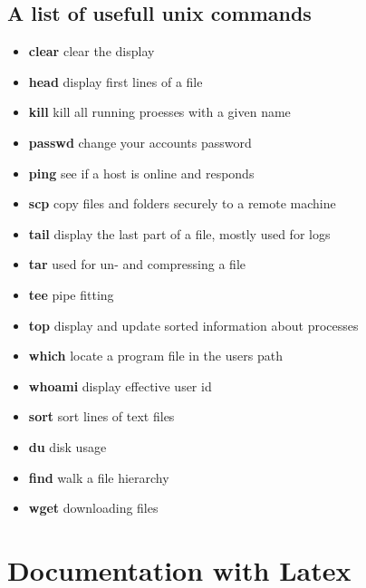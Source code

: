 \documentclass[10pt,a4paper]{scrartcl}
\begin{document}
\begin{description}
\subsection{A list of usefull unix commands}
\begin{doublespacing}
\begin{itemize}
\item{\bf{clear}} \qquad clear the display
\item{\bf{head}} \qquad 	 display first lines of a file
\item{\bf{kill}}	\qquad kill all running proesses with a given name
\item{\bf{passwd}}	\qquad change your accounts password
\item{\bf{ping}}	\qquad see if a host is online and responds
\item{\bf{scp}}		\qquad copy files and folders securely to a remote machine
\item{\bf{tail}}	\qquad display the last part of a file, mostly used for logs
\item{\bf{tar}}		\qquad used for un- and compressing a file
\item{\bf{tee}}		\qquad pipe fitting
\item{\bf{top}}		\qquad display and update sorted information about processes
\item{\bf{which}}	\qquad locate a program file in the users path
\item{\bf{whoami}}	\qquad display effective user id
\item{\bf{sort}}	\qquad sort lines of text files
\item{\bf{du}}		\qquad disk usage
\item{\bf{find}}	\qquad walk a file hierarchy
\item{\bf{wget}}	\qquad downloading files
\end{itemize}
\end{doublespacing}


\end{description}


\section{Documentation with Latex}
\end{document}
